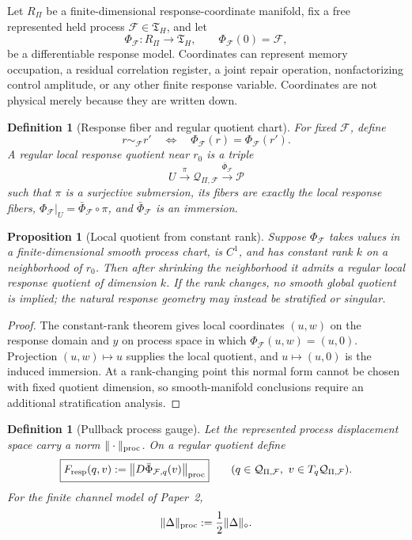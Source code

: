 \documentclass[11pt]{article}
\newtheorem{proposition}[theorem]{Proposition}
\newtheorem{definition}[theorem]{Definition}
\theoremstyle{remark}
\newcommand{\Pproc}{\mathcal P}
\newcommand{\Qresp}{\mathcal Q}
\newcommand{\Fresp}{F_{\rm resp}}
\newcommand{\Tproc}{\mathfrak T_H}
\begin{document}
Let $R_\Pi$ be a finite-dimensional response-coordinate manifold, fix a free represented held process $\mathcal F\in\Tproc$, and let
\[
        \Phi_{\mathcal F}:R_\Pi\longrightarrow\Tproc,
        \qquad
        \Phi_{\mathcal F}(0)=\mathcal F,
\]
be a differentiable response model.  Coordinates can represent memory occupation, a residual correlation register, a joint repair operation, nonfactorizing control amplitude, or any other finite response variable.  Coordinates are not physical merely because they are written down.

\begin{definition}[Response fiber and regular quotient chart]
For fixed $\mathcal F$, define
\[
        r\sim_{\mathcal F}r'
        \quad\Longleftrightarrow\quad
        \Phi_{\mathcal F}(r)=\Phi_{\mathcal F}(r').
\]
A regular local response quotient near $r_0$ is a triple
\[
        U\xrightarrow{\pi}\Qresp_{\Pi,\mathcal F}
        \xrightarrow{\bar\Phi_{\mathcal F}}\Pproc
\]
such that $\pi$ is a surjective submersion, its fibers are exactly the local response fibers, $\Phi_{\mathcal F}|_U=\bar\Phi_{\mathcal F}\circ\pi$, and $\bar\Phi_{\mathcal F}$ is an immersion.
\end{definition}

\begin{proposition}[Local quotient from constant rank]
\label{prop:constant-rank-response-quotient}
Suppose $\Phi_{\mathcal F}$ takes values in a finite-dimensional smooth process chart, is $C^1$, and has constant rank $k$ on a neighborhood of $r_0$.  Then after shrinking the neighborhood it admits a regular local response quotient of dimension $k$.  If the rank changes, no smooth global quotient is implied; the natural response geometry may instead be stratified or singular.
\end{proposition}

\begin{proof}
The constant-rank theorem gives local coordinates $(u,w)$ on the response domain and $y$ on process space in which $\Phi_{\mathcal F}(u,w)=(u,0)$.  Projection $(u,w)\mapsto u$ supplies the local quotient, and $u\mapsto(u,0)$ is the induced immersion.  At a rank-changing point this normal form cannot be chosen with fixed quotient dimension, so smooth-manifold conclusions require an additional stratification analysis.
\end{proof}

\begin{definition}[Pullback process gauge]
Let the represented process displacement space carry a norm $\|\cdot\|_{\rm proc}$.  On a regular quotient define
\[
        \boxed{
        \Fresp(q,v)
        :=
        \left\|D\bar\Phi_{\mathcal F,q}(v)\right\|_{\rm proc}
        }
        \qquad
        (q\in\Qresp_{\Pi,\mathcal F},\ v\in T_q\Qresp_{\Pi,\mathcal F}).
\]
For the finite channel model of Paper~2,
\[
        \|\Delta\|_{\rm proc}:=\frac12\|\Delta\|_\diamond.
\]
\end{definition}
\end{document}
